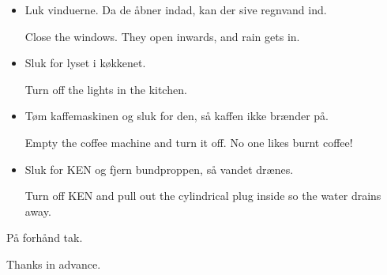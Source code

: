 \documentclass{article}
\begin{document}
\maketitle

\null
\vspace{-2cm}


\huge

\vspace{-1cm}

\dansk

\begin{itemize}

\item Luk vinduerne. Da de åbner indad, kan der sive regnvand ind.

\english Close the windows. They open inwards, and rain gets in.

\dansk \item Sluk for lyset i køkkenet.

\english Turn off the lights in the kitchen.

\dansk \item Tøm kaffemaskinen og sluk for den, så kaffen ikke brænder på.

\english Empty the coffee machine and turn it off. No one likes burnt coffee!

\dansk \item Sluk for KEN og fjern bundproppen, så vandet drænes.

\english Turn off KEN and pull out the cylindrical plug inside so the water
drains away.

\end{itemize}

\begin{center}

\huge

På forhånd tak. \\

\english

Thanks in advance.

\vspace{-1cm}

\end{center}

\underskriv
\end{document}
